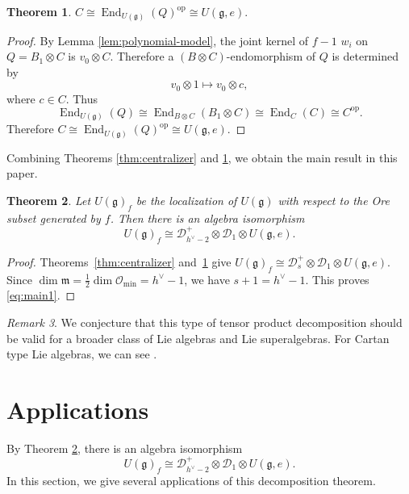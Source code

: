 \documentclass[12pt,a4paper]{amsart}
\numberwithin{equation}{section}
\newtheorem{theorem}{Theorem}[section]
\theoremstyle{definition}
\theoremstyle{remark}
\newtheorem{remark}[theorem]{Remark}
\newcommand{\g}{\mathfrak g}
\newcommand{\m}{\mathfrak m}
\newcommand{\D}{\mathcal D}
\newcommand{\End}{\operatorname{End}}
\newcommand{\Uf}{U(\g)_f}
\begin{document}
\begin{theorem}
\label{thm:W-identification}
$C\cong\End_{U(\g)}(Q)^{\mathrm{op}}
\cong U(\g,e).$
\end{theorem}

\begin{proof}
By Lemma \ref{lem:polynomial-model}, the joint kernel of $f-1$ $w_i$ on
$Q=B_1\otimes C$ is $v_0\otimes C$.  Therefore a
$(B\otimes C)$-endomorphism of $Q$ is determined by
\[
v_0\otimes1\mapsto v_0\otimes c,
\] where $c\in C$.
  Thus
\[
\End_{U(\g)}(Q)\cong \End_{B\otimes  C}(B_1\otimes C)\cong \End_{C}(C)
\cong C^{\mathrm{op}}.
\]
Therefore
$C\cong\End_{U(\g)}(Q)^{\mathrm{op}}
\cong U(\g,e)$.
\end{proof}

Combining Theorems \ref{thm:centralizer} and \ref{thm:W-identification}, we obtain the main result in this paper.

\begin{theorem}\label{thm:main1}
Let $\Uf$
be the localization of $U(\g)$ with respect to the Ore subset
generated by $f$.
Then there is an algebra isomorphism
\begin{equation}\label{eq:main1}
 \Uf\cong \D^+_{h^\vee-2}\otimes \D_1\otimes U(\g,e).
\end{equation}
\end{theorem}


\begin{proof}
Theorems~\ref{thm:centralizer} and~\ref{thm:W-identification} give
\(\Uf\cong\D^+_s\otimes \D_1\otimes U(\g,e)\).
Since  $\dim \m=\frac{1}{2}\dim\mathcal{O}_{\mathrm{min}}=h^{\vee}-1$,
we have $s+1=h^{\vee}-1$. This proves \eqref{eq:main1}.
\end{proof}

\begin{remark} We  conjecture that this type of tensor product decomposition should be valid for a broader class of Lie algebras and Lie superalgebras. For Cartan type Lie algebras, we can see \cite{LZ24}.
\end{remark}



\section{Applications}\label{sec:applications}

By Theorem \ref{thm:main1}, there is an algebra isomorphism
\begin{equation}\label{eq:main22}
 \Uf\cong \D^+_{h^\vee-2}\otimes \D_1\otimes U(\g,e).
\end{equation}
In this section, we give several applications of this decomposition theorem.
\end{document}
